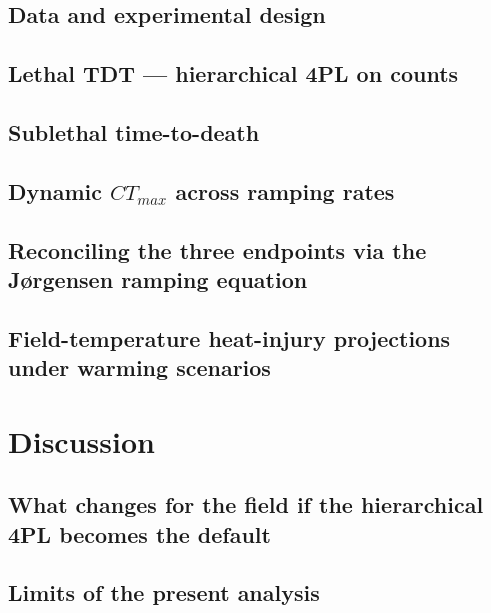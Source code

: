 \documentclass[
  11pt,
]{article}
\begin{document}
\subsection{Data and experimental
design}\label{data-and-experimental-design}

\subsection{Lethal TDT --- hierarchical 4PL on
counts}\label{lethal-tdt-hierarchical-4pl-on-counts}

\subsection{Sublethal time-to-death}\label{sublethal-time-to-death}

\subsection{\texorpdfstring{Dynamic \(CT_{max}\) across ramping
rates}{Dynamic CT\_\{max\} across ramping rates}}\label{dynamic-ct_max-across-ramping-rates}

\subsection{Reconciling the three endpoints via the Jørgensen ramping
equation}\label{reconciling-the-three-endpoints-via-the-juxf8rgensen-ramping-equation}

\subsection{Field-temperature heat-injury projections under warming
scenarios}\label{field-temperature-heat-injury-projections-under-warming-scenarios}

\section{Discussion}\label{discussion}

\subsection{What changes for the field if the hierarchical 4PL becomes
the
default}\label{what-changes-for-the-field-if-the-hierarchical-4pl-becomes-the-default}

\subsection{Limits of the present
analysis}\label{limits-of-the-present-analysis}
\end{document}
